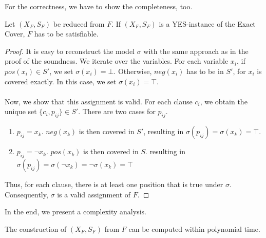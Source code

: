 For the correctness, we have to show the completeness, too.
\begin{lemma}[Completeness]
    \label{lemma:2}
    Let $(X_F, S_F)$ be reduced from $F$. If $(X_F, S_F)$ is a YES-instance of the Exact Cover, $F$ has to be satisfiable.
\end{lemma}
\begin{proof}
    It is easy to reconstruct the model $\sigma$ with the same approach as in the proof of the soundness. 
    We iterate over the variables. For each variable $x_i$, if $pos(x_i) \in S'$, we set $\sigma(x_i) = \bot$. 
    Otherwise, $neg(x_i)$ has to be in $S'$, for $x_i$ is covered exactly. In this case, we set $\sigma(x_i) = \top$. \\\\
    Now, we show that this assignment is valid. For each clause $c_i$, we obtain the unique set $\{c_i, p_{ij}\} \in S'$.
    There are two cases for $p_{ij}$.
    \begin{enumerate}
        \item $p_{ij} = x_k$. $neg(x_k)$ is then covered in $S'$, resulting in $\sigma(p_{ij}) = \sigma(x_k) = \top$.
        \item $p_{ij} = \neg x_k$. $pos(x_k)$ is then covered in $S$. resulting in $\sigma(p_{ij}) = \sigma(\neg x_k) = \neg \sigma(x_k) = \top$
    \end{enumerate}
    Thus, for each clause, there is at least one position that is true under $\sigma$. 
    Consequently, $\sigma$ is a valid assignment of $F$.
\end{proof}
In the end, we present a complexity analysis.
\begin{lemma}
    \label{lemma:3}
    The construction of $(X_F, S_F)$ from $F$ can be computed within polynomial time. 
\end{lemma}
